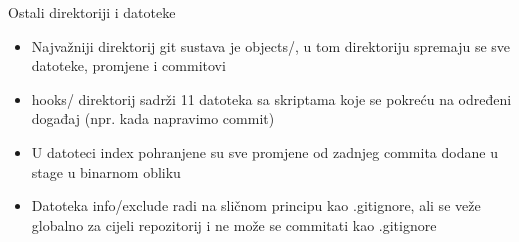 \begin{frame}{Ostali direktoriji i datoteke}
	\begin{itemize}
		\item{Najvažniji direktorij git sustava je objects/, u tom direktoriju spremaju se sve datoteke, promjene i commitovi}
		\item{hooks/ direktorij sadrži 11 datoteka sa skriptama koje se pokreću na određeni događaj (npr. kada napravimo commit)}
		\item{U datoteci index pohranjene su sve promjene od zadnjeg commita dodane u stage u binarnom obliku}
		\item{Datoteka info/exclude radi na sličnom principu kao .gitignore, ali se veže globalno za cijeli repozitorij i ne može se commitati kao .gitignore}
	\end{itemize}
\end{frame}